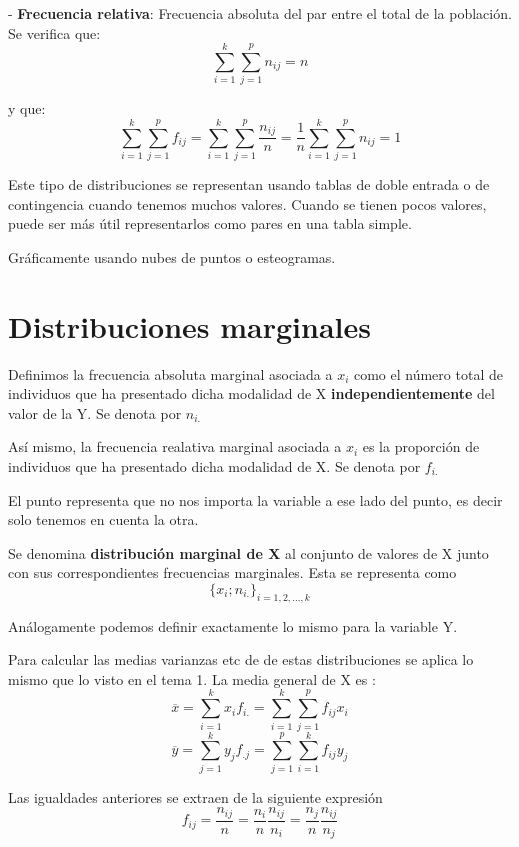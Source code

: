 \documentclass{article}
\begin{document}
  
  - \textbf{Frecuencia relativa}: Frecuencia absoluta del par entre el total de la población. \\
  
  Se verifica que:    $$ \sum_{i=1}^{k} \sum_{j=1}^{p} n_{ij} = n$$
  
  y que: $$\sum_{i=1}^{k} \sum_{j=1}^{p} f_{ij} = \sum_{i=1}^{k} \sum_{j=1}^{p} \frac{n_{ij}}{n} = \frac{1}{n} \sum_{i=1}^{k} \sum_{j=1}^{p} n_{ij} = 1$$
 
 Este tipo de distribuciones se representan usando tablas de doble entrada o de contingencia cuando tenemos muchos valores. Cuando se tienen pocos valores, puede ser más útil representarlos como pares en una tabla simple.
 
 \vspace{5cm}
 
Gráficamente usando nubes de puntos o esteogramas. 

\section{Distribuciones marginales}

	Definimos la frecuencia absoluta marginal asociada a $x_i$ como el número total de individuos que ha presentado dicha modalidad de X \textbf{independientemente} del valor de la Y. Se denota por $n_{i.}$
	
	Así mismo, la frecuencia realativa marginal asociada a $x_i$ es la proporción de individuos que ha presentado dicha modalidad de X. Se denota por $f_{i.}$
	
	El punto representa que no nos importa la variable a ese lado del punto, es decir solo tenemos en cuenta la otra.
	
	Se denomina \textbf{ distribución marginal de X} al conjunto de valores de X junto con sus correspondientes frecuencias marginales. Esta se representa como 
	$$\{x_i;n_{i.}\}_{i = 1,2,\dots,k}$$
	
	Análogamente podemos definir exactamente lo mismo para la variable Y.
	
	Para calcular las medias varianzas etc de de estas distribuciones se aplica lo mismo que lo visto en el tema 1.
	La media general de X es : $$ \overline{x} = \sum_{i=1}^k x_i f_{i.} =\sum_{i=1}^{k} \sum_{j=1}^{p} f_{ij} x_i$$
	$$ \overline{y} = \sum_{j=1}^k y_j f_{.j} =\sum_{j=1}^{p} \sum_{i=1}^{k} f_{ij} y_j$$
	
	Las igualdades anteriores se extraen de la siguiente expresión $$f_{ij} = \frac{n_{ij}}{n} = \frac{n_i}{n} \frac{n_{ij}} {n_i} = \frac{n_j}{n} \frac{n_{ij}}{n_j} $$
	
\end{document}
